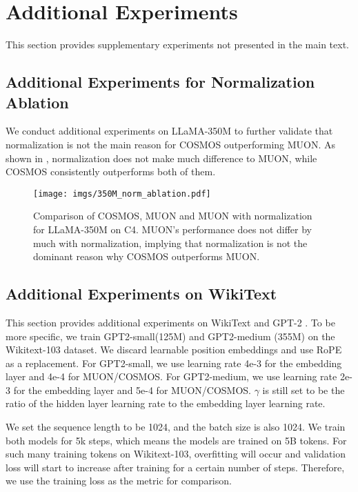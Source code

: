 \section{Additional Experiments}
This section provides supplementary experiments not presented in the main text. 
\subsection{Additional Experiments for Normalization Ablation}
\label{sec:exp-350m-norm}
We conduct additional experiments on LLaMA-350M to further validate that normalization is not the main reason for COSMOS outperforming MUON.
As shown in , normalization does not make much difference to MUON, while COSMOS consistently outperforms both of them. 

\begin{figure}[htb!]
    \centering
    \texttt{[image: imgs/350M\_norm\_ablation.pdf]}
    \caption{Comparison of COSMOS, MUON and MUON with normalization for LLaMA-350M on C4. MUON's performance does not differ by much with normalization, implying that normalization is not the dominant reason why COSMOS outperforms MUON.}
    \label{fig:exp-350m-norm}
\end{figure}

\subsection{Additional Experiments on WikiText}\label{sec:wiki}
This section provides additional experiments on WikiText \citep{merity2016pointer} and GPT-2 \citep{radford2019language}. To be more specific, we train GPT2-small(125M) and GPT2-medium (355M) on the Wikitext-103 dataset. We discard learnable position embeddings and use RoPE \citep{su2024roformer} as a replacement. For GPT2-small, we use learning rate 4e-3 for the embedding layer and 4e-4 for MUON/COSMOS. 
For GPT2-medium, we use learning rate 2e-3 for the embedding layer and 5e-4 for MUON/COSMOS. 
$\gamma$ is still set to be the ratio of the hidden layer learning rate to the embedding layer learning rate. 

We set the sequence length to be 1024, and the batch size is also 1024. 
We train both models for 5k steps, which means the models are trained on 5B tokens. For such many training tokens on Wikitext-103, overfitting will occur and validation loss will start to increase after training for a certain number of steps. Therefore, we use the training loss as the metric for comparison.

